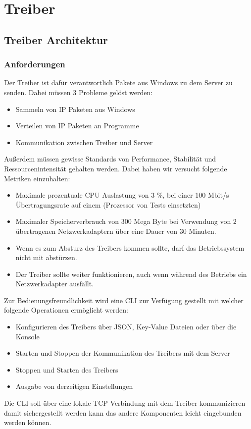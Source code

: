 \chapter{Treiber}
\label{chap:Treiber}

\section{Treiber Architektur}
\subsection{Anforderungen}
Der Treiber ist dafür verantwortlich Pakete aus Windows zu dem Server zu senden. Dabei müssen 3 Probleme gelöst werden:
\begin{itemize}
    \item Sammeln von IP Paketen aus Windows
    \item Verteilen von IP Paketen an Programme
    \item Kommunikation zwischen Treiber und Server
\end{itemize}
Außerdem müssen gewisse Standards von Performance, Stabilität und Ressourcenintensität gehalten werden. Dabei haben wir versucht folgende Metriken einzuhalten:
\begin{itemize}
    \item Maximale prozentuale CPU Auslastung von 3 \%, bei einer 100 Mbit/s Übertragungsrate auf einem (Prozessor von Tests einsetzten)
    \item Maximaler Speicherverbrauch von 300 Mega Byte bei Verwendung von 2 übertragenen Netzwerkadaptern über eine Dauer von 30 Minuten.
    \item Wenn es zum Absturz des Treibers kommen sollte, darf das Betriebssystem nicht mit abstürzen.
    \item Der Treiber sollte weiter funktionieren, auch wenn während des Betriebs ein Netzwerkadapter ausfällt.
\end{itemize}
Zur Bedienungsfreundlichkeit wird eine CLI zur Verfügung gestellt mit welcher folgende Operationen ermöglicht werden:
\begin{itemize}
    \item Konfigurieren des Treibers über JSON, Key-Value Dateien oder über die Konsole
    \item Starten und Stoppen der Kommunikation des Treibers mit dem Server
    \item Stoppen und Starten des Treibers
    \item Ausgabe von derzeitigen Einstellungen
\end{itemize}
Die CLI soll über eine lokale TCP Verbindung mit dem Treiber kommunizieren damit sichergestellt werden kann das andere Komponenten leicht eingebunden werden können.
\newpage
